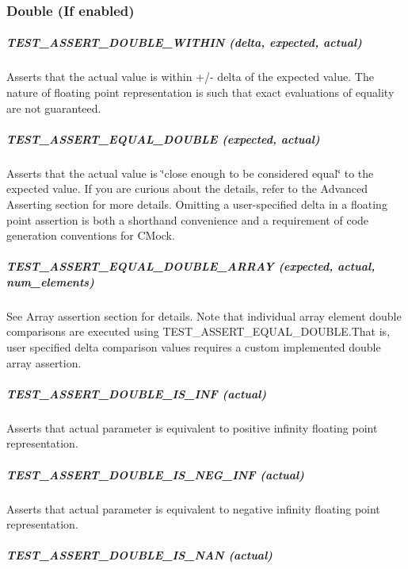 \subsubsection*{Double (If enabled)}

\subparagraph*{{\ttfamily T\+E\+S\+T\+\_\+\+A\+S\+S\+E\+R\+T\+\_\+\+D\+O\+U\+B\+L\+E\+\_\+\+W\+I\+T\+H\+IN (delta, expected, actual)}}

Asserts that the {\ttfamily actual} value is within +/-\/ {\ttfamily delta} of the {\ttfamily expected} value. The nature of floating point representation is such that exact evaluations of equality are not guaranteed.

\subparagraph*{{\ttfamily T\+E\+S\+T\+\_\+\+A\+S\+S\+E\+R\+T\+\_\+\+E\+Q\+U\+A\+L\+\_\+\+D\+O\+U\+B\+LE (expected, actual)}}

Asserts that the {\ttfamily actual} value is \char`\"{}close enough to be considered equal\char`\"{} to the {\ttfamily expected} value. If you are curious about the details, refer to the Advanced Asserting section for more details. Omitting a user-\/specified delta in a floating point assertion is both a shorthand convenience and a requirement of code generation conventions for C\+Mock.

\subparagraph*{{\ttfamily T\+E\+S\+T\+\_\+\+A\+S\+S\+E\+R\+T\+\_\+\+E\+Q\+U\+A\+L\+\_\+\+D\+O\+U\+B\+L\+E\+\_\+\+A\+R\+R\+AY (expected, actual, num\+\_\+elements)}}

See Array assertion section for details. Note that individual array element double comparisons are executed using {\ttfamily T\+E\+S\+T\+\_\+\+A\+S\+S\+E\+R\+T\+\_\+\+E\+Q\+U\+A\+L\+\_\+\+D\+O\+U\+B\+LE}.That is, user specified delta comparison values requires a custom implemented double array assertion.

\subparagraph*{{\ttfamily T\+E\+S\+T\+\_\+\+A\+S\+S\+E\+R\+T\+\_\+\+D\+O\+U\+B\+L\+E\+\_\+\+I\+S\+\_\+\+I\+NF (actual)}}

Asserts that {\ttfamily actual} parameter is equivalent to positive infinity floating point representation.

\subparagraph*{{\ttfamily T\+E\+S\+T\+\_\+\+A\+S\+S\+E\+R\+T\+\_\+\+D\+O\+U\+B\+L\+E\+\_\+\+I\+S\+\_\+\+N\+E\+G\+\_\+\+I\+NF (actual)}}

Asserts that {\ttfamily actual} parameter is equivalent to negative infinity floating point representation.

\subparagraph*{{\ttfamily T\+E\+S\+T\+\_\+\+A\+S\+S\+E\+R\+T\+\_\+\+D\+O\+U\+B\+L\+E\+\_\+\+I\+S\+\_\+\+N\+AN (actual)}}

